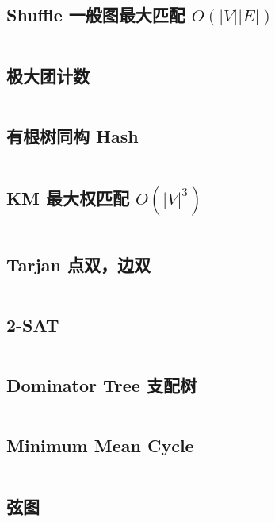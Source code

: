 \documentclass[titlepage, a4paper]{article}
\begin{document}
\begin{multicols}{2}
\begin{spacing}{0.6}
				\subsection{Shuffle 一般图最大匹配 $O(|V| |E|)$ \checkmark}
				\inputminted{cpp}{src/TreeandGraph/一般图最大匹配-shuffle.cpp}
				\subsection{极大团计数 \checkmark}
				\inputminted{cpp}{src/TreeandGraph/CliqueCount.cpp}
				\subsection{有根树同构 Hash \checkmark}
				\inputminted{cpp}{src/TreeandGraph/TreeHash.cpp}
				\subsection{KM 最大权匹配 $O(|V|^3)$}
				\inputminted{cpp}{src/TreeandGraph/KM.cpp}
				\subsection{Tarjan 点双，边双}
				\inputminted{cpp}{src/TreeandGraph/Tarjan.cpp}
				\subsection{2-SAT \checkmark}
				\inputminted{cpp}{src/TreeandGraph/2-sat.cpp}
				\subsection{Dominator Tree 支配树 \checkmark}
				\inputminted{cpp}{src/TreeandGraph/支配树.cpp}
				\subsection{Minimum Mean Cycle}
				\inputminted{cpp}{src/TreeandGraph/MeanCycle.cpp}
				\subsection{弦图 \checkmark}
				
				\inputminted{cpp}{src/TreeandGraph/弦图.cpp}

\end{spacing}
\end{multicols}
\end{document}
